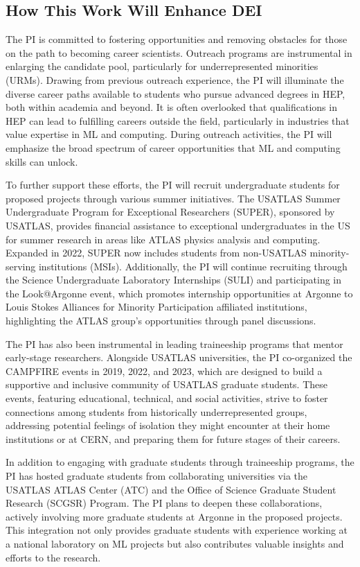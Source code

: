 \documentclass[letter, USenglish, 11pt, subfigure]{article}
\begin{document}
\subsection{How This Work Will Enhance DEI}

The PI is committed to fostering opportunities and removing obstacles for those on the path to becoming career scientists. Outreach programs are instrumental in enlarging the candidate pool, particularly for underrepresented minorities (URMs). Drawing from previous outreach experience, the PI will illuminate the diverse career paths available to students who pursue advanced degrees in HEP, both within academia and beyond. It is often overlooked that qualifications in HEP can lead to fulfilling careers outside the field, particularly in industries that value expertise in ML and computing. During outreach activities, the PI will emphasize the broad spectrum of career opportunities that ML and computing skills can unlock.

To further support these efforts, the PI will recruit undergraduate students for proposed projects through various summer initiatives. The USATLAS Summer Undergraduate Program for Exceptional Researchers (SUPER), sponsored by USATLAS, provides financial assistance to exceptional undergraduates in the US for summer research in areas like ATLAS physics analysis and computing. Expanded in 2022, SUPER now includes students from non-USATLAS minority-serving institutions (MSIs). Additionally, the PI will continue recruiting through the Science Undergraduate Laboratory Internships (SULI) and participating in the Look@Argonne event, which promotes internship opportunities at Argonne to Louis Stokes Alliances for Minority Participation affiliated institutions, highlighting the ATLAS group’s opportunities through panel discussions.

The PI has also been instrumental in leading traineeship programs that mentor early-stage researchers. Alongside USATLAS universities, the PI co-organized the CAMPFIRE events in 2019, 2022, and 2023, which are designed to build a supportive and inclusive community of USATLAS graduate students. These events, featuring educational, technical, and social activities, strive to foster connections among students from historically underrepresented groups, addressing potential feelings of isolation they might encounter at their home institutions or at CERN, and preparing them for future stages of their careers.

In addition to engaging with graduate students through traineeship programs, the PI has hosted graduate students from collaborating universities via the USATLAS ATLAS Center (ATC) and the Office of Science Graduate Student Research (SCGSR) Program. The PI plans to deepen these collaborations, actively involving more graduate students at Argonne in the proposed projects. This integration not only provides graduate students with experience working at a national laboratory on ML projects but also contributes valuable insights and efforts to the research.
\end{document}
